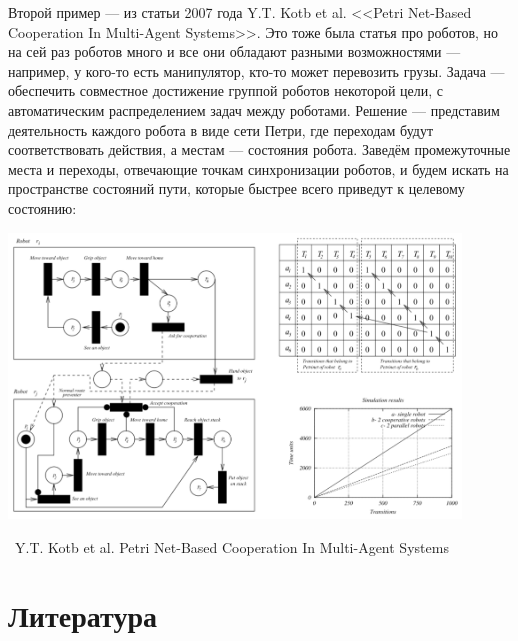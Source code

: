 \documentclass[a5paper]{article}
\newcommand{\attribution}[1] {
    \vspace{-5mm}\begin{flushright}\begin{scriptsize}%
    {\textcopyright\, #1}\end{scriptsize}\end{flushright}
}
\begin{document}
Второй пример --- из статьи 2007 года Y.T. Kotb et al. <<Petri Net-Based Cooperation In Multi-Agent Systems>>. Это тоже была статья про роботов, но на сей раз роботов много и все они обладают разными возможностями --- например, у кого-то есть манипулятор, кто-то может перевозить грузы. Задача --- обеспечить совместное достижение группой роботов некоторой цели, с автоматическим распределением задач между роботами. Решение --- представим деятельность каждого робота в виде сети Петри, где переходам будут соответствовать действия, а местам --- состояния робота. Заведём промежуточные места и переходы, отвечающие точкам синхронизации роботов, и будем искать на пространстве состояний пути, которые быстрее всего приведут к целевому состоянию:

\begin{center}
    \includegraphics[width=0.9\textwidth]{petriUsageExample2.png}
    \attribution{Y.T. Kotb et al. Petri Net-Based Cooperation In Multi-Agent Systems}
\end{center}

\section{Литература}
\end{document}

